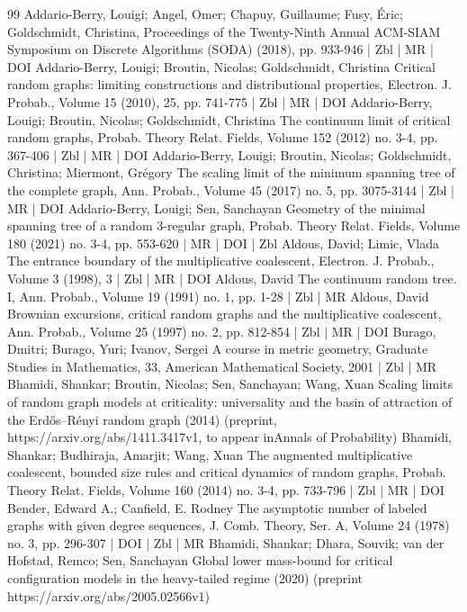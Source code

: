 \begin{thebibliography}{99}
Addario-Berry, Louigi; Angel, Omer; Chapuy, Guillaume; Fusy, Éric; Goldschmidt, Christina, Proceedings of the Twenty-Ninth Annual ACM-SIAM Symposium on Discrete Algorithms (SODA) (2018), pp. 933-946 | Zbl | MR | DOI
Addario-Berry, Louigi; Broutin, Nicolas; Goldschmidt, Christina Critical random graphs: limiting constructions and distributional properties, Electron. J. Probab., Volume 15 (2010), 25, pp. 741-775 | Zbl | MR | DOI
Addario-Berry, Louigi; Broutin, Nicolas; Goldschmidt, Christina The continuum limit of critical random graphs, Probab. Theory Relat. Fields, Volume 152 (2012) no. 3-4, pp. 367-406 | Zbl | MR | DOI
Addario-Berry, Louigi; Broutin, Nicolas; Goldschmidt, Christina; Miermont, Grégory The scaling limit of the minimum spanning tree of the complete graph, Ann. Probab., Volume 45 (2017) no. 5, pp. 3075-3144 | Zbl | MR | DOI
Addario-Berry, Louigi; Sen, Sanchayan Geometry of the minimal spanning tree of a random 3-regular graph, Probab. Theory Relat. Fields, Volume 180 (2021) no. 3-4, pp. 553-620 | MR | DOI | Zbl
Aldous, David; Limic, Vlada The entrance boundary of the multiplicative coalescent, Electron. J. Probab., Volume 3 (1998), 3 | Zbl | MR | DOI
Aldous, David The continuum random tree. I, Ann. Probab., Volume 19 (1991) no. 1, pp. 1-28 | Zbl | MR
Aldous, David Brownian excursions, critical random graphs and the multiplicative coalescent, Ann. Probab., Volume 25 (1997) no. 2, pp. 812-854 | Zbl | MR | DOI
Burago, Dmitri; Burago, Yuri; Ivanov, Sergei A course in metric geometry, Graduate Studies in Mathematics, 33, American Mathematical Society, 2001 | Zbl | MR
Bhamidi, Shankar; Broutin, Nicolas; Sen, Sanchayan; Wang, Xuan Scaling limits of random graph models at criticality: universality and the basin of attraction of the Erdős–Rényi random graph (2014) (preprint, https://arxiv.org/abs/1411.3417v1, to appear inAnnals of Probability)
Bhamidi, Shankar; Budhiraja, Amarjit; Wang, Xuan The augmented multiplicative coalescent, bounded size rules and critical dynamics of random graphs, Probab. Theory Relat. Fields, Volume 160 (2014) no. 3-4, pp. 733-796 | Zbl | MR | DOI
Bender, Edward A.; Canfield, E. Rodney The asymptotic number of labeled graphs with given degree sequences, J. Comb. Theory, Ser. A, Volume 24 (1978) no. 3, pp. 296-307 | DOI | Zbl | MR
Bhamidi, Shankar; Dhara, Souvik; van der Hofstad, Remco; Sen, Sanchayan Global lower mass-bound for critical configuration models in the heavy-tailed regime (2020) (preprint https://arxiv.org/abs/2005.02566v1)

\end{thebibliography}
